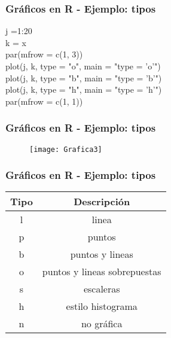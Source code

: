 \documentclass[12pt]{beamer}
\begin{document}
	\begin{frame}
		\frametitle{Gráficos en R - Ejemplo: tipos}
			j =1:20\\
		    k = x\\
		    par(mfrow = c(1, 3))\\
		    
		    plot(j, k, type = "o", main = "type = 'o'")\\
		    plot(j, k, type = "b", main = "type = 'b'")\\
		    plot(j, k, type = "h", main = "type = 'h'")\\
		    
		    par(mfrow = c(1, 1))
	\end{frame}

	\begin{frame}
		\frametitle{Gráficos en R - Ejemplo: tipos}
		\begin{figure}
			\centering
			\texttt{[image: Grafica3]}
		
			\label{fig:grafica3}
		\end{figure}
	\end{frame}

	\begin{frame}
		\frametitle{Gráficos en R - Ejemplo: tipos}
		
		\begin{table}
			\begin{tabular}{cc}
				\hline
				Tipo& Descripción \\
				\hline
				l& linea \\
				
				p&puntos  \\
				
				b&puntos y lineas \\
				
				o&puntos y lineas sobrepuestas \\
				
				s&escaleras  \\
				
				h&estilo histograma  \\
				
				n&no gráfica  \\
				\hline
			\end{tabular}
		\end{table}
	\end{frame}
\end{document}
